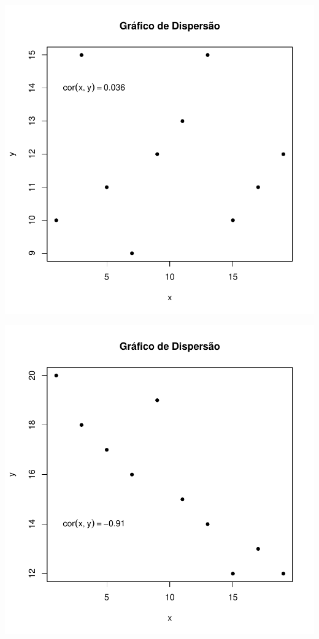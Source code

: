 \documentclass[14pt,aspectratio=1610]{beamer}
\begin{document}
\begin{frame}[fragile]{}
\begin{center}
\includegraphics{Aula10-004}
\end{center}
\end{frame}

\begin{frame}[fragile]{}
\begin{center}
\includegraphics{Aula10-005}
\end{center}
\end{frame}
\end{document}

